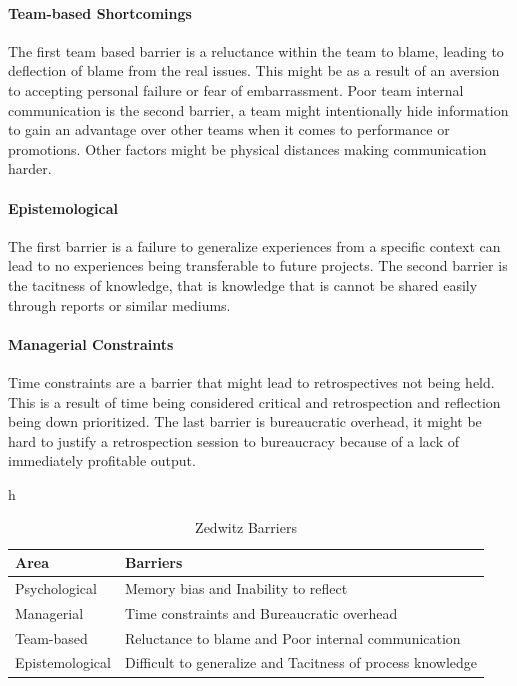 \paragraph{Team-based Shortcomings}
The first team based barrier is a reluctance within the team to blame, leading to deflection of blame from the real issues. This might be as a result of an aversion to accepting personal failure or fear of embarrassment. Poor team internal communication is the second barrier, a team might intentionally hide information to gain an advantage over other teams when it comes to performance or promotions. Other factors might be physical distances making communication harder.

\paragraph{Epistemological}
The first barrier is a failure to generalize experiences from a specific context can lead to no experiences being transferable to future projects. The second barrier is the tacitness of knowledge, that is knowledge that is cannot be shared easily through reports or similar mediums.

\paragraph{Managerial Constraints}
Time constraints are a barrier that might lead to retrospectives not being held. This is a result of time being considered critical and retrospection and reflection being down prioritized. The last barrier is bureaucratic overhead, it might be hard to justify a retrospection session to bureaucracy because of a lack of immediately profitable output.

\begin{table}{h}
	\begin{center}
	\caption{Zedwitz Barriers}
	\label{table:zedwitz-barriers}
	\begin{tabular}{p{} | p{}}
	\hline
	Area & Barriers \\
	\hline
	Psychological & Memory bias and Inability to reflect \\
	Managerial & Time constraints and Bureaucratic overhead \\
	Team-based & Reluctance to blame and Poor internal communication \\
	Epistemological & Difficult to generalize and Tacitness of process knowledge \\
	\end{tabular}
	\end{center}
\end{table}

